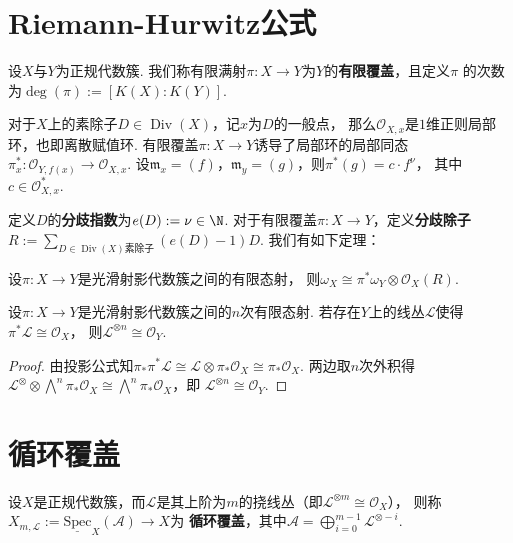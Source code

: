 \newcommand{\spec}{\operatorname{Spec}}
\newcommand{\Div}{\operatorname{Div}}
\newcommand{\scO}{\mathscr{O}}
\newcommand{\scL}{\mathscr{L}}
\newcommand{\fm}{\mathfrak{m}}

\section{Riemann-Hurwitz公式}
\begin{definition}
    设$X$与$Y$为正规代数簇. 
    我们称有限满射$\pi:X \to Y$为$Y$的\textbf{有限覆盖}，且定义$\pi$
    的次数为$\deg(\pi) := [K(X):K(Y)]$.
\end{definition}

对于$X$上的素除子$D \in \Div(X)$，记$x$为$D$的一般点，
那么$\scO_{X,x}$是$1$维正则局部环，也即离散赋值环.
有限覆盖$\pi:X \to Y$诱导了局部环的局部同态
$\pi_{x}^{*}:\scO_{Y,f(x)} \to \scO_{X,x}$. 
设$\fm_{x} = (f)$，$\fm_{y} = (g)$，则$\pi^{*}(g) = c \cdot f^{\nu}$，
其中$c \in \scO_{X,x}^{*}$.

定义$D$的\textbf{分歧指数}为$e(D) := \nu \in \N$. 
对于有限覆盖$\pi:X \to Y$，定义\textbf{分歧除子}
$R := \sum_{D \in \Div(X)素除子}(e(D) - 1)D$. 我们有如下定理：


\begin{theorem}
    设$\pi:X \to Y$是光滑射影代数簇之间的有限态射，
    则$\omega_{X} \cong \pi^{*}\omega_{Y} \otimes \scO_{X}(R)$.
\end{theorem}

\begin{proposition}
    设$\pi:X \to Y$是光滑射影代数簇之间的$n$次有限态射.
    若存在$Y$上的线丛$\scL$使得$\pi^{*}\scL \cong \scO_{X}$，
    则$\scL^{\otimes n} \cong \scO_{Y}$.
\end{proposition}
\begin{proof}
    由投影公式知$\pi_{*}\pi^{*}\scL \cong \scL \otimes \pi_{*}\scO_{X} \cong \pi_{*}\scO_{X}$.
    两边取$n$次外积得
    $\scL^{\otimes} \otimes \bigwedge\nolimits^{n}\pi_{*}\scO_{X}
    \cong \bigwedge\nolimits^{n}\pi_{*}\scO_{X}$，即
    $\scL^{\otimes n} \cong \scO_{Y}$.
\end{proof}

\section{循环覆盖}
\begin{definition}
    设$X$是正规代数簇，而$\mathscr{L}$是其上阶为$m$的挠线丛（即$\mathscr{L}^{\otimes m} \cong \mathscr{O}_{X}$），
    则称$X_{m,\mathscr{L}} := \underline{\mathrm{Spec}}_{X}(\mathscr{A}) \to X$为
    \textbf{循环覆盖}，其中$\mathscr{A} = \bigoplus_{i=0}^{m-1}\mathscr{L}^{\otimes -i}$.
\end{definition}

